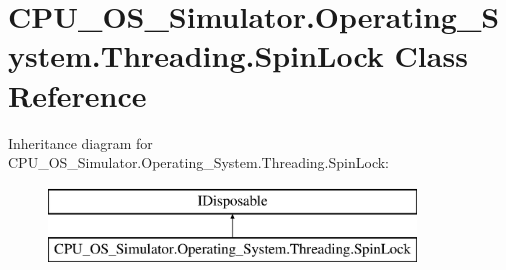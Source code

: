 \hypertarget{class_c_p_u___o_s___simulator_1_1_operating___system_1_1_threading_1_1_spin_lock}{}\section{C\+P\+U\+\_\+\+O\+S\+\_\+\+Simulator.\+Operating\+\_\+\+System.\+Threading.\+Spin\+Lock Class Reference}
\label{class_c_p_u___o_s___simulator_1_1_operating___system_1_1_threading_1_1_spin_lock}
Inheritance diagram for C\+P\+U\+\_\+\+O\+S\+\_\+\+Simulator.\+Operating\+\_\+\+System.\+Threading.\+Spin\+Lock\+:\begin{figure}[H]
\begin{center}
\leavevmode
\includegraphics[height=2.000000cm]{class_c_p_u___o_s___simulator_1_1_operating___system_1_1_threading_1_1_spin_lock}
\end{center}
\end{figure}
